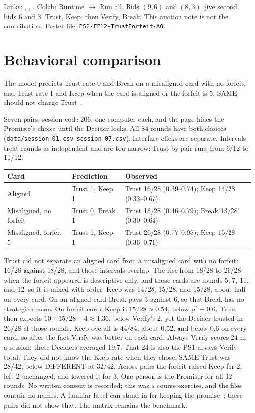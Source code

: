 Links: \GitHubLink, \NotebookLink, \HuggingFaceLink. Colab: Runtime $\rightarrow$ Run all. Bids $(9,6)$ and $(8,3)$ give second bids 6 and 3: Trust, Keep, then Verify, Break. This auction note is not the contribution. Poster file: \texttt{PS2-FP12-TrustForfeit-A0}.

\section{Behavioral comparison}
The model predicts Trust rate 0 and Break on a misaligned card with no forfeit, and Trust rate 1 and Keep when the card is aligned or the forfeit is 5. SAME should not change Trust~\cite{kahneman2002,debruine2002}.

Seven pairs, session code 206, one computer each, and the page hides the Promiser's choice until the Decider locks. All 84 rounds have both choices (\texttt{data/session-01.csv}--\texttt{session-07.csv}). Interface clicks are separate. Intervals treat rounds as independent and are too narrow; Trust by pair runs from 6/12 to 11/12.

\begin{center}\scriptsize
\begin{tabularx}{\columnwidth}{@{}p{1.55cm}Yp{2.05cm}@{}}\toprule
\textbf{Card}&\textbf{Prediction}&\textbf{Observed}\\\midrule
Aligned&Trust 1, Keep 1&Trust 16/28 (0.39--0.74); Keep 14/28 (0.33--0.67)\\
Misaligned, no forfeit&Trust 0, Break 1&Trust 18/28 (0.46--0.79); Break 13/28 (0.30--0.64)\\
Misaligned, forfeit 5&Trust 1, Keep 1&Trust 26/28 (0.77--0.98); Keep 15/28 (0.36--0.71)\\
\bottomrule\end{tabularx}\end{center}

Trust did not separate an aligned card from a misaligned card with no forfeit: 16/28 against 18/28, and those intervals overlap. The rise from 18/28 to 26/28 when the forfeit appeared is descriptive only, and those cards are rounds 5, 7, 11, and 12, so it is mixed with order. Keep was 14/28, 15/28, and 15/28, about half on every card. On an aligned card Break pays 3 against 6, so that Break has no strategic reason. On forfeit cards Keep is \(15/28 \approx 0.54\), below \(p^\ast=0.6\). Trust then expects \(10\times 15/28 - 4 \approx 1.36\), below Verify's 2, yet the Decider trusted in 26/28 of those rounds. Keep overall is 44/84, about 0.52, and below 0.6 on every card, so after the fact Verify was better on each card. Always Verify scores 24 in a session; these Deciders averaged 19.7. That 24 is also the PS1 always-Verify total. They did not know the Keep rate when they chose. SAME Trust was 28/42, below DIFFERENT at 32/42. Across pairs the forfeit raised Keep for 2, left 2 unchanged, and lowered it for 3. One person is the Promiser for all 12 rounds. No written consent is recorded; this was a course exercise, and the files contain no names. A familiar label can stand in for keeping the promise~\cite{kahneman2002,debruine2002}; these pairs did not show that. The matrix remains the benchmark.


